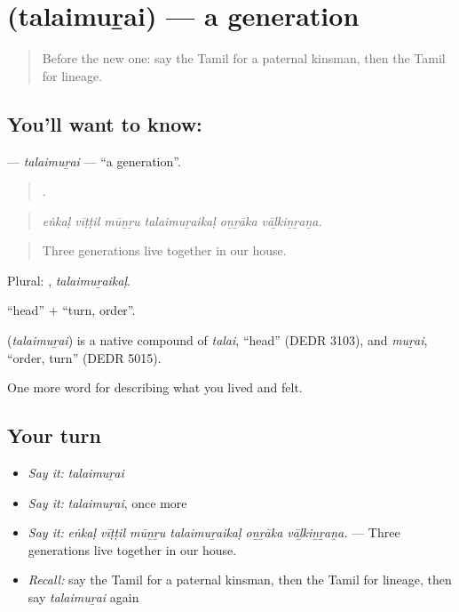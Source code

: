 \section[\texorpdfstring{\ta{தலைமுறை} (talaimuṟai)}{தலைமுறை (talaimuṟai)}]{ (talaimuṟai) — a generation}

\label{lesson:TA-C494-talaimurai}



\begin{quote}
Before the new one: say the Tamil for a paternal kinsman, then the Tamil for lineage.
\end{quote}

\subsection*{You'll want to know: }
\textbf{} — \emph{talaimuṟai} — \textquotedblleft{}a generation\textquotedblright{}.

\begin{quote}
     .
\end{quote}

\begin{quote}
\emph{eṅkaḷ vīṭṭil mūṉṟu talaimuṟaikaḷ oṉṟāka vāḻkiṉṟaṉa.}
\end{quote}

\begin{quote}
Three generations live together in our house.
\end{quote}

Plural: , \emph{talaimuṟaikaḷ}.

 \textquotedblleft{}head\textquotedblright{} +  \textquotedblleft{}turn, order\textquotedblright{}.

\begin{cousinweb}
\textbf{} (\emph{talaimuṟai}) is a native compound of  \emph{talai}, \textquotedblleft{}head\textquotedblright{} (DEDR 3103), and  \emph{muṟai}, \textquotedblleft{}order, turn\textquotedblright{} (DEDR 5015).
\end{cousinweb}

\begin{grammarlens}[title={What you've built}]
One more word for describing what you lived and felt.
\end{grammarlens}

\subsection*{Your turn}
\begin{itemize}
\raggedright
  \item \emph{Say it:} \emph{talaimuṟai}
  \item \emph{Say it:} \emph{talaimuṟai}, once more
  \item \emph{Say it:} \emph{eṅkaḷ vīṭṭil mūṉṟu talaimuṟaikaḷ oṉṟāka vāḻkiṉṟaṉa.} — Three generations live together in our house.
  \item \emph{Recall:} say the Tamil for a paternal kinsman, then the Tamil for lineage, then say \emph{talaimuṟai} again
\end{itemize}


